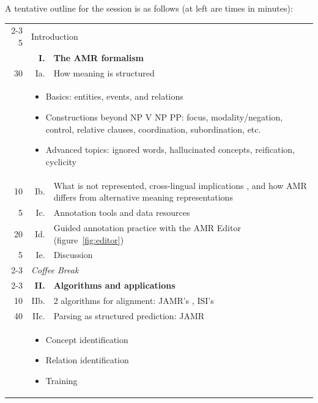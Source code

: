 \documentclass[11pt,letterpaper]{article}
\newcommand{\fref}[1]{figure~\ref{#1}}
\begin{document}
A tentative outline for the session is as follows 
(at left are times in minutes):
\begin{center}\small
\hypersetup{citecolor=mdblue}
\noindent\begin{tabular}{@{}r@{~~}|r@{~}p{19em}|@{}}
\cline{2-3}
5 & \multicolumn{2}{l|}{Introduction}\\
  & \textbf{I.} & \textbf{The AMR formalism} \citep{amr,amr-guidelines}\\
30 & Ia. & How meaning is structured\\
  & \multicolumn{2}{l|}{\parbox{20em}{\begin{itemize}
	\item Basics: entities, events, and relations
	\item Constructions beyond NP V NP PP: focus, modality/negation, control, 
relative clauses, coordination, subordination, etc.
	\item Advanced topics: ignored words, hallucinated concepts, reification, cyclicity %
\end{itemize}}} \\
10 & Ib. & What is not represented, cross-lingual implications \citep{xue-14}, and how AMR differs from alternative meaning representations\\
 5 & Ic. & Annotation tools and data resources\\
20 & Id. & Guided annotation practice with the AMR Editor (\fref{fig:editor})\\
 5 & Ie. & Discussion\\
\cline{2-3}
\multicolumn{1}{@{}r}{15} & \multicolumn{2}{l}{\textit{Coffee Break}}\\
\cline{2-3}
  & \textbf{II.} & \textbf{Algorithms and applications}\\
10 & IIb. & 2 algorithms for alignment: JAMR's \citep{flanigan-14}, ISI's \citep{pourdamghani-14} \\
40 & IIc. & Parsing as structured prediction: JAMR \citep{flanigan-14} \\
  & \multicolumn{2}{l|}{\parbox{20em}{\begin{itemize}
	\item Concept identification
	\item Relation identification
	\item Training

\end{itemize}}}
\end{tabular}
\end{center}
\end{document}
